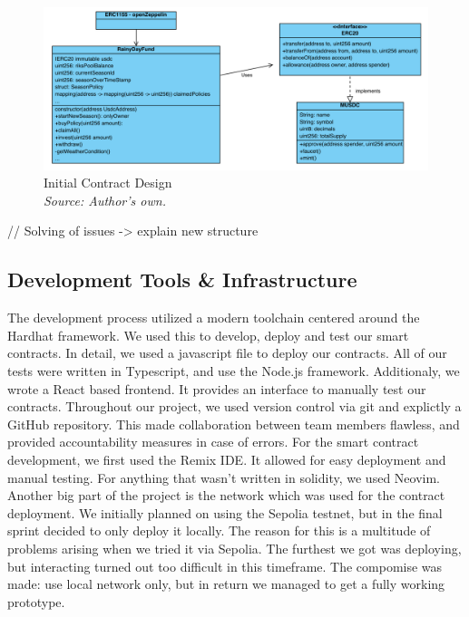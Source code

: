 \documentclass[11pt,a4paper]{article}
\begin{document}
    \begin{figure}[H]
        \centering
        \includegraphics[scale=0.5]{graphics/ClassDiagram_Old}
        \caption{Initial Contract Design \\ \textit{Source: Author's own.}}
        \label{fig:initial-contract-design}
    \end{figure}

    // Solving of issues -> explain new structure


    \subsection{Development Tools \& Infrastructure}\label{subsec:development-tools-infrastructure}
    The development process utilized a modern toolchain centered around the Hardhat framework.
    We used this to develop, deploy and test our smart contracts.
    In detail, we used a javascript file to deploy our contracts.
    All of our tests were written in Typescript, and use the Node.js framework.
    Additionaly, we wrote a React based frontend.
    It provides an interface to manually test our contracts.
    Throughout our project, we used version control via git and explictly a GitHub repository.
    This made collaboration between team members flawless, and provided accountability measures in case of errors.
    For the smart contract development, we first used the Remix IDE. It allowed for easy deployment and manual testing.
    For anything that wasn't written in solidity, we used Neovim.
    Another big part of the project is the network which was used for the contract deployment.
    We initially planned on using the Sepolia testnet, but in the final sprint decided to only deploy it locally.
    The reason for this is a multitude of problems arising when we tried it via Sepolia.
    The furthest we got was deploying, but interacting turned out too difficult in this timeframe.
    The compomise was made: use local network only, but in return we managed to get a fully working prototype.
\end{document}
